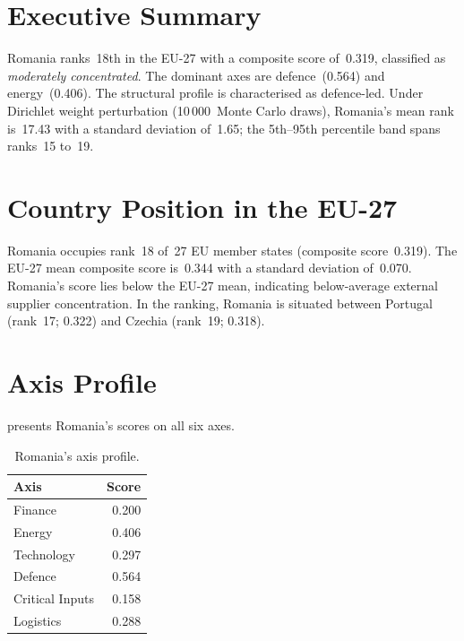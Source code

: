 \documentclass[12pt,a4paper]{article}
\begin{document}
\hypersetup{pageanchor=true}
\pagestyle{fancy}
\renewcommand{\headrulewidth}{0.4pt}


\section{Executive Summary}
\label{sec:summary}

Romania ranks~18th in the EU-27 with a composite \ISI score of~0.319, classified as \emph{moderately concentrated}.  The dominant axes are defence~(0.564) and energy~(0.406).  The structural profile is characterised as defence-led.  Under Dirichlet weight perturbation (10\,000~Monte Carlo draws), Romania's mean rank is~17.43 with a standard deviation of~1.65; the 5th--95th percentile band spans ranks~15 to~19.


\section{Country Position in the EU-27}
\label{sec:position}

Romania occupies rank~18 of~27 EU member states (composite score~0.319).  The EU-27 mean composite score is~0.344 with a standard deviation of~0.070.  Romania's score lies below the EU-27 mean, indicating below-average external supplier concentration.  In the ranking, Romania is situated between Portugal (rank~17; 0.322) and Czechia (rank~19; 0.318).


\section{Axis Profile}
\label{sec:axis-profile}

 presents Romania's scores on all six \ISI axes.

\begin{table}[htbp]
\centering\small
\caption{Romania's \ISI axis profile.}
\label{tab:axis-profile}
\begin{tabular}{@{}lr@{}}
\toprule
\textbf{Axis} & \textbf{Score} \\
\midrule
    Finance           & 0.200 \\
    Energy            & 0.406 \\
    Technology        & 0.297 \\
    Defence           & 0.564 \\
    Critical Inputs   & 0.158 \\
    Logistics         & 0.288 \\
\bottomrule
\end{tabular}
\end{table}
\end{document}
